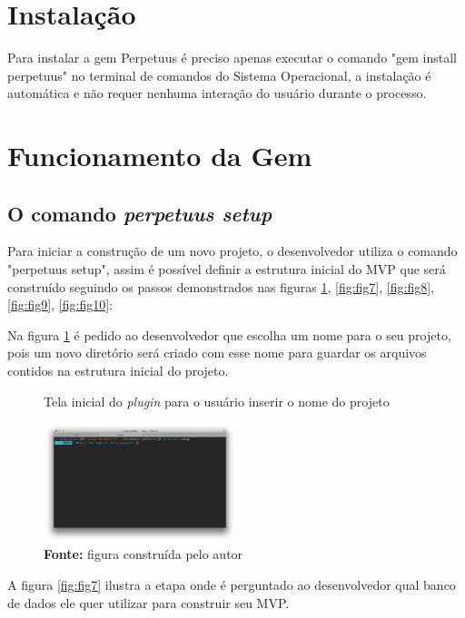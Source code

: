 \section{Instala\c{c}\~ao}

Para instalar a gem Perpetuus \'e preciso apenas executar o comando "gem install perpetuus" no terminal de comandos do Sistema Operacional, a instala\c{c}\~ao \'e autom\'atica e n\~ao requer nenhuma intera\c{c}\~ao do usu\'ario durante o processo.

\section{Funcionamento da Gem}

\subsection{O comando \emph{perpetuus setup}}

Para iniciar a constru\c{c}\~ao de um novo projeto, o desenvolvedor utiliza o comando "perpetuus setup", assim \'e poss\'ivel definir a estrutura inicial do MVP que ser\'a constru\'ido seguindo os passos demonstrados nas figuras \ref{fig:fig6}, \ref{fig:fig7}, \ref{fig:fig8}, \ref{fig:fig9}, \ref{fig:fig10}:

Na figura \ref{fig:fig6} \'e pedido ao desenvolvedor que escolha um nome para o seu projeto, pois um novo diret\'orio ser\'a criado com esse nome para guardar os arquivos contidos na estrutura inicial do projeto.

\begin{figure}[h]
  \centering
  \caption{Tela inicial do \emph{plugin} para o usu\'ario inserir o nome do projeto}
  \includegraphics[width=0.5\textwidth]{./fig/setup1}
  \caption*{\textbf{Fonte:} figura constru\'ida pelo autor}
  \label{fig:fig6}
\end{figure}

A figura \ref{fig:fig7} ilustra a etapa onde \'e perguntado ao desenvolvedor qual banco de dados ele quer utilizar para construir seu MVP.

